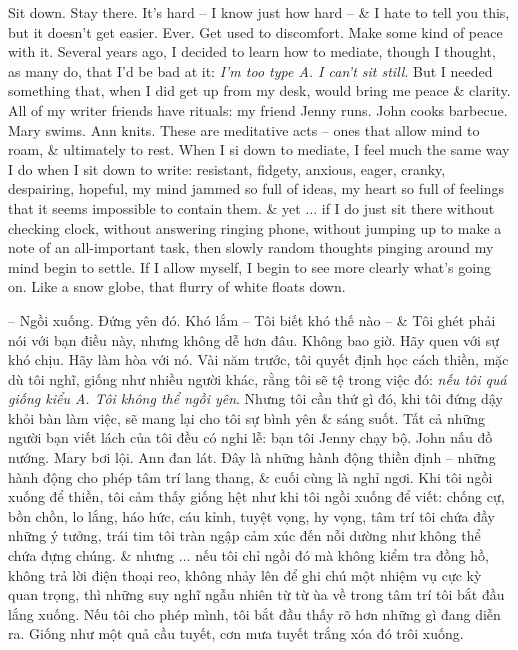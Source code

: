 \documentclass{article}
\begin{document}
\begin{itemize}
	Sit down. Stay there. It's hard -- I know just how hard -- \& I hate to tell you this, but it doesn't get easier. Ever. Get used to discomfort. Make some kind of peace with it. Several years ago, I decided to learn how to mediate, though I thought, as many do, that I'd be bad at it: {\it I'm too type A. I can't sit still}. But I needed something that, when I did get up from my desk, would bring me peace \& clarity. All of my writer friends have rituals: my friend Jenny runs. John cooks barbecue. Mary swims. Ann knits. These are meditative acts -- ones that allow mind to roam, \& ultimately to rest. When I si down to mediate, I feel much the same way I do when I sit down to write: resistant, fidgety, anxious, eager, cranky, despairing, hopeful, my mind jammed so full of ideas, my heart so full of feelings that it seems impossible to contain them. \& yet $\ldots$ if I do just sit there without checking clock, without answering ringing phone, without jumping up to make a note of an all-important task, then slowly random thoughts pinging around my mind begin to settle. If I allow myself, I begin to see more clearly what's going on. Like a snow globe, that flurry of white floats down.
	
	-- Ngồi xuống. Đứng yên đó. Khó lắm -- Tôi biết khó thế nào -- \& Tôi ghét phải nói với bạn điều này, nhưng không dễ hơn đâu. Không bao giờ. Hãy quen với sự khó chịu. Hãy làm hòa với nó. Vài năm trước, tôi quyết định học cách thiền, mặc dù tôi nghĩ, giống như nhiều người khác, rằng tôi sẽ tệ trong việc đó: {\it nếu tôi quá giống kiểu A. Tôi không thể ngồi yên}. Nhưng tôi cần thứ gì đó, khi tôi đứng dậy khỏi bàn làm việc, sẽ mang lại cho tôi sự bình yên \& sáng suốt. Tất cả những người bạn viết lách của tôi đều có nghi lễ: bạn tôi Jenny chạy bộ. John nấu đồ nướng. Mary bơi lội. Ann đan lát. Đây là những hành động thiền định -- những hành động cho phép tâm trí lang thang, \& cuối cùng là nghỉ ngơi. Khi tôi ngồi xuống để thiền, tôi cảm thấy giống hệt như khi tôi ngồi xuống để viết: chống cự, bồn chồn, lo lắng, háo hức, cáu kỉnh, tuyệt vọng, hy vọng, tâm trí tôi chứa đầy những ý tưởng, trái tim tôi tràn ngập cảm xúc đến nỗi dường như không thể chứa đựng chúng. \& nhưng $\ldots$ nếu tôi chỉ ngồi đó mà không kiểm tra đồng hồ, không trả lời điện thoại reo, không nhảy lên để ghi chú một nhiệm vụ cực kỳ quan trọng, thì những suy nghĩ ngẫu nhiên từ từ ùa về trong tâm trí tôi bắt đầu lắng xuống. Nếu tôi cho phép mình, tôi bắt đầu thấy rõ hơn những gì đang diễn ra. Giống như một quả cầu tuyết, cơn mưa tuyết trắng xóa đó trôi xuống.
	

\end{itemize}
\end{document}

